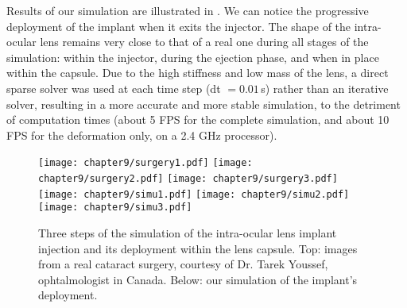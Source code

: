 Results of our simulation are illustrated in . We can notice the progressive deployment of the implant when it exits the injector.  The shape of the intra-ocular lens remains very close to that of a real one during all stages of the simulation: within the injector, during the ejection phase, and when in place within the capsule. Due to the high stiffness and low mass of the lens, a direct sparse solver was used at each time step (dt $= 0.01\,$s) rather than an iterative solver, resulting in a more accurate and more stable simulation, to the detriment of computation times (about 5 FPS for the complete simulation, and about 10 FPS for the deformation only, on a 2.4 GHz processor).

\begin{figure}[ht]
\centering
\texttt{[image: chapter9/surgery1.pdf]}
\hfill
\texttt{[image: chapter9/surgery2.pdf]}
\hfill
\texttt{[image: chapter9/surgery3.pdf]} \\
\vspace{0.1cm}
\texttt{[image: chapter9/simu1.pdf]}
\hfill
\texttt{[image: chapter9/simu2.pdf]}
\hfill
\texttt{[image: chapter9/simu3.pdf]}
\caption [Lens imlant] {Three steps of the simulation of the intra-ocular lens implant injection and its deployment within the lens capsule. Top: images from a real cataract surgery, courtesy of Dr. Tarek Youssef, ophtalmologist in Canada. Below: our simulation of the implant's deployment.}
\label{chap9:fig-simu-results}
\end{figure}

